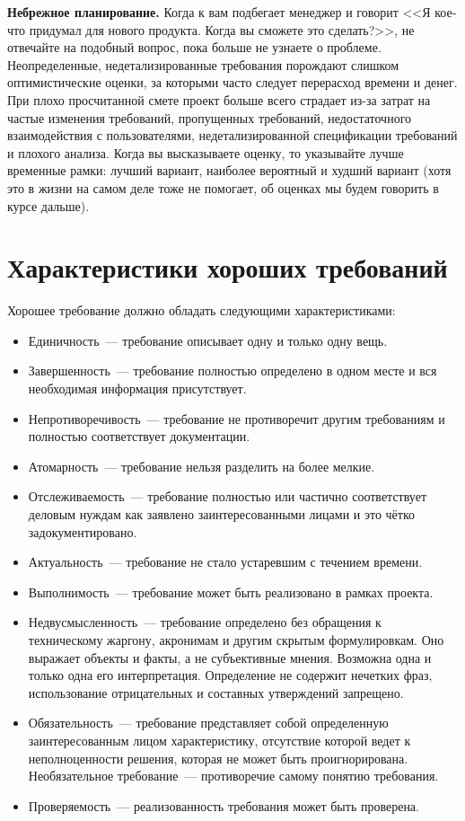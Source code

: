 \documentclass{../../text-style}
\begin{document}
\textbf{Небрежное планирование.} Когда к вам подбегает менеджер и говорит <<Я кое-что придумал для нового продукта. Когда вы сможете это сделать?>>, не отвечайте на подобный вопрос, пока больше не узнаете о проблеме. Неопределенные, недетализированные требования порождают слишком оптимистические оценки, за которыми часто следует перерасход времени и денег. При плохо просчитанной смете проект больше всего страдает из-за затрат на частые изменения требований, пропущенных требований, недостаточного взаимодействия с пользователями, недетализированной спецификации требований и плохого анализа. Когда вы высказываете оценку, то указывайте лучше временные рамки: лучший вариант, наиболее вероятный и худший вариант (хотя это в жизни на самом деле тоже не помогает, об оценках мы будем говорить в курсе дальше).

\section{Характеристики хороших требований}
Хорошее требование должно обладать следующими характеристиками:

\begin{itemize}
    \item Единичность~--- требование описывает одну и только одну вещь.
    \item Завершенность~--- требование полностью определено в одном месте и вся необходимая информация присутствует.
    \item Непротиворечивость~--- требование не противоречит другим требованиям и полностью соответствует документации.
    \item Атомарность~--- требование нельзя разделить на более мелкие.
    \item Отслеживаемость~--- требование полностью или частично соответствует деловым нуждам как заявлено заинтересованными лицами и это чётко задокументировано.
    \item Актуальность~--- требование не стало устаревшим с течением времени.
    \item Выполнимость~--- требование может быть реализовано в рамках проекта.
    \item Недвусмысленность~--- требование определено без обращения к техническому жаргону, акронимам и другим скрытым формулировкам. Оно выражает объекты и факты, а не субъективные мнения. Возможна одна и только одна его интерпретация. Определение не содержит нечетких фраз, использование отрицательных и составных утверждений запрещено.
    \item Обязательность~--- требование представляет собой определенную заинтересованным лицом характеристику, отсутствие которой ведет к неполноценности решения, которая не может быть проигнорирована. Необязательное требование~--- противоречие самому понятию требования.
    \item Проверяемость~--- реализованность требования может быть проверена.
\end{itemize}
\end{document}
